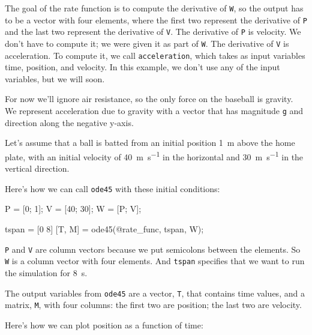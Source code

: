 
The goal of the rate function is to compute the derivative of \lstinline{W}, so the output has to be a vector with four elements, where the first two represent the derivative of \lstinline{P}  and the last two represent the derivative of \lstinline{V}.
The derivative of \lstinline{P} is velocity.  We don't have to compute it; we were given it as part of \lstinline{W}.
The derivative of \lstinline{V} is acceleration.  To compute it, we call \lstinline{acceleration}, which takes as input variables time, position, and velocity.  In this example, we don't use any of the input variables, but we will soon.


For now we'll ignore air resistance, so the only force on the baseball is gravity.  We represent acceleration due to gravity with a vector that has magnitude \lstinline{g} and direction along the negative y-axis.

Let's assume that a ball is batted from an initial position \SI{1}{\meter} above the home plate, with an initial velocity of \SI{40}{\meter\per\second} in the horizontal and \SI{30}{\meter\per\second} in the vertical direction.


Here's how we can call \lstinline{ode45} with these initial conditions:
 
\begin{code}
    P = [0; 1];       %
    V = [40; 30];     %
    W = [P; V];       %
    
    tspan = [0 8]
    [T, M] = ode45(@rate_func, tspan, W);
\end{code}

\lstinline{P} and \lstinline{V} are column vectors because we put semicolons between the elements.  
So \lstinline{W} is a column vector with four elements.
And \lstinline{tspan} specifies that we want to run the simulation for \SI{8}{\second}.


The output variables from \lstinline{ode45} are a vector, 
\lstinline{T}, that contains time values, and a matrix, \lstinline{M}, with four columns: the first two are position; the last two are velocity.

Here's how we can plot position as a function of time:

